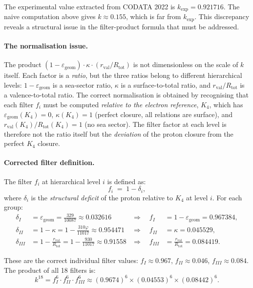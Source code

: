 \documentclass[12pt,a4paper]{article}
\theoremstyle{plain}
\theoremstyle{definition}
\theoremstyle{remark}
\newcommand{\Kfour}{K_4}
\newcommand{\vp}{\varphi}
\newcommand{\kap}{\kappa}
\newcommand{\rval}{r_{\mathrm{val}}}
\newcommand{\Rtot}{R_{\mathrm{tot}}}
\newcommand{\egeom}{\varepsilon_{\mathrm{geom}}}
\begin{document}
The experimental value extracted from CODATA 2022 \citep{CODATA2022} is $k_{\exp} = 0.921716$. The naive computation above gives $k \approx 0.155$, which is far from $k_{\exp}$. This discrepancy reveals a structural issue in the filter-product formula that must be addressed.

\paragraph{The normalisation issue.} The product $(1-\egeom)\cdot\kap\cdot(\rval/\Rtot)$ is not dimensionless on the scale of $k$ itself. Each factor is a \emph{ratio}, but the three ratios belong to different hierarchical levels: $1-\egeom$ is a sea-sector ratio, $\kap$ is a surface-to-total ratio, and $\rval/\Rtot$ is a valence-to-total ratio. The correct normalisation is obtained by recognising that each filter $f_i$ must be computed \emph{relative to the electron reference}, $\Kfour$, which has $\egeom(\Kfour) = 0$, $\kap(\Kfour) = 1$ (perfect closure, all relations are surface), and $\rval(\Kfour)/\Rtot(\Kfour) = 1$ (no sea sector). The filter factor at each level is therefore not the ratio itself but the \emph{deviation} of the proton closure from the perfect $\Kfour$ closure.

\paragraph{Corrected filter definition.} The filter $f_i$ at hierarchical level $i$ is defined as:
\[
f_i \;=\; 1 - \delta_i,
\]
where $\delta_i$ is the \emph{structural deficit} of the proton relative to $\Kfour$ at level $i$. For each group:
\begin{align*}
\delta_I &= \egeom = \frac{329}{10087}\approx 0.032616 & \Rightarrow\quad f_I &= 1 - \egeom = 0.967384,\\
\delta_{II} &= 1 - \kap = 1 - \frac{310\vp}{11017}\approx 0.954471 & \Rightarrow\quad f_{II} &= \kap = 0.045529,\\
\delta_{III} &= 1 - \frac{\rval}{\Rtot} = 1 - \frac{930}{11017}\approx 0.91558 & \Rightarrow\quad f_{III} &= \frac{\rval}{\Rtot} = 0.084419.
\end{align*}

These are the correct individual filter values: $f_I \approx 0.967$, $f_{II} \approx 0.046$, $f_{III}\approx 0.084$. The product of all 18 filters is:
\[
k^{18} = f_I^6\cdot f_{II}^6\cdot f_{III}^6 \approx (0.9674)^6\times(0.04553)^6\times(0.08442)^6.
\]
\end{document}
